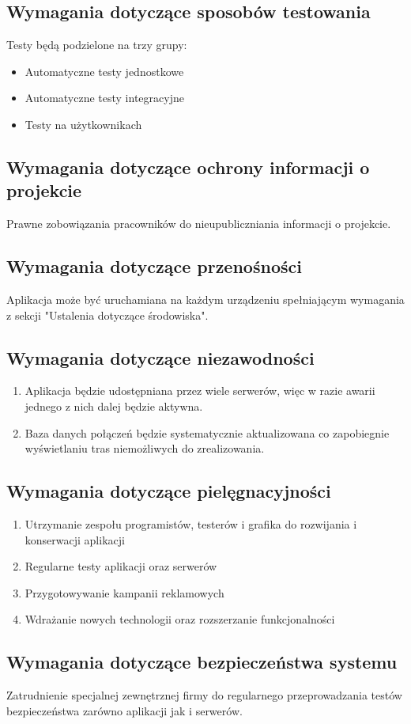 \documentclass[12pt,a4paper]{report}
\begin{document}
\subsection{Wymagania dotyczące sposobów testowania}
Testy będą podzielone na trzy grupy:
\begin{itemize}
	\item Automatyczne testy jednostkowe
	\item Automatyczne testy integracyjne
	\item Testy na użytkownikach
\end{itemize}
\subsection{Wymagania dotyczące ochrony informacji o projekcie}
	Prawne zobowiązania pracowników do nieupubliczniania informacji o projekcie.
\subsection{Wymagania dotyczące przenośności}
	Aplikacja może być uruchamiana na każdym urządzeniu spełniającym wymagania z sekcji "Ustalenia dotyczące środowiska".
\subsection{Wymagania dotyczące niezawodności}
\begin{enumerate}
	\item Aplikacja będzie udostępniana przez wiele serwerów, więc w razie awarii jednego z nich dalej będzie aktywna.
	\item Baza danych połączeń będzie systematycznie aktualizowana co zapobiegnie wyświetlaniu tras niemożliwych do zrealizowania.
\end{enumerate}
\subsection{Wymagania dotyczące pielęgnacyjności}
\begin{enumerate}
	\item Utrzymanie zespołu programistów, testerów i grafika do rozwijania i konserwacji aplikacji
	\item Regularne testy aplikacji oraz serwerów
	\item Przygotowywanie kampanii reklamowych
	\item Wdrażanie nowych technologii oraz rozszerzanie funkcjonalności
\end{enumerate}	
\subsection{Wymagania dotyczące bezpieczeństwa systemu}
	Zatrudnienie specjalnej zewnętrznej firmy do regularnego przeprowadzania testów bezpieczeństwa zarówno aplikacji jak i serwerów.
\end{document}
